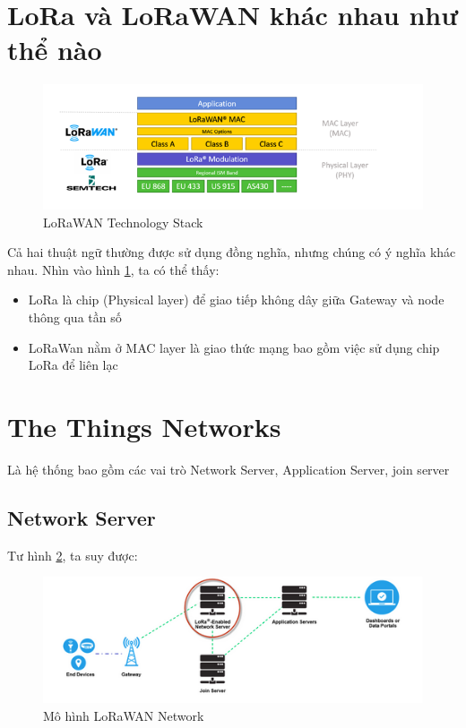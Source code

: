 \section{LoRa và LoRaWAN khác nhau như thể nào}

\begin{figure}[H]
    \includegraphics[width=\textwidth]{images/Quanh/LoraWan_Stack.png}
    \caption{LoRaWAN Technology Stack}
    \label{fig:lorawan_stack}
\end{figure}

Cả hai thuật ngữ thường được sử dụng đồng nghĩa, nhưng chúng có ý nghĩa khác nhau. Nhìn vào hình \ref{fig:lorawan_stack}, ta có thể thấy:
\begin{itemize}
    \item LoRa là chip (Physical layer) để giao tiếp không dây giữa Gateway và node thông qua tần số
    \item LoRaWan nằm ở MAC layer là giao thức mạng bao gồm việc sử dụng chip LoRa để liên lạc
\end{itemize}

\section{The Things Networks}
Là hệ thống bao gồm các vai trò Network Server, Application Server, join server

\subsection{Network Server}
Tư hình \ref{fig:lorawan_network}, ta suy được:
\begin{figure}[h]
    \includegraphics[width=\textwidth]{images/Quanh/LoraWan_Netwrok.png}
    \caption{Mô hình LoRaWAN Network}
    \label{fig:lorawan_network}
\end{figure}

